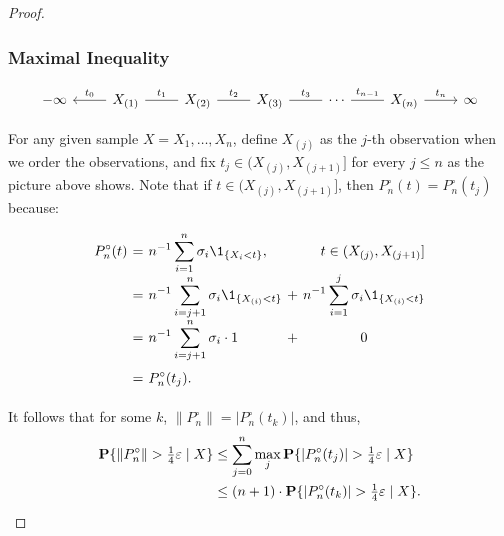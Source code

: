 \begin{proof}
  \vspace*{1em}

  \subsubsection*{Maximal Inequality}

  \[\begin{tikzcd}
    {-\infty} & {X_{(1)}} & {X_{(2)}} & {X_{(3)}} & \cdots & {X_{(n)}} & \infty
    \arrow["{t_1}", no head, from=1-2, to=1-3]%
    \arrow["{t_2}", no head, from=1-3, to=1-4]%
    \arrow["{t_3}", no head, from=1-4, to=1-5]%
    \arrow["{t_{n-1}}", no head, from=1-5, to=1-6]%
    \arrow["{t_0}"', from=1-2, to=1-1]%
    \arrow["{t_n}", from=1-6, to=1-7]%
  \end{tikzcd}\]

  For any given sample $X = X_1, \ldots, X_n$, define $X_{(j)}$ as the $j$-th observation when we order the observations, and fix $t_j \in (X_{(j)}, X_{(j+1)}]$ for every $j\leq n$ as the picture above shows. Note that if $t \in (X_{(j)}, X_{(j+1)}]$, then $P_n^\circ (t) = P_n^\circ (t_j)$ because:  %

  \[ \everymath{\displaystyle}\arraycolsep=1.8pt\def\arraystretch{1.8}
  \begin{array}{rclcl}
    P_n^\circ (t) & = & n^{-1}\sum_{i = 1}^n \sigma_i\1_{\{ X_i < t\}}, & & \hfill t \in (X_{(j)}, X_{(j+1)}] \\ %
    & = & n^{-1}\sum_{i = j+1}^{n} \sigma_i\1_{\{ X_{(i)} < t\}} & + & n^{-1} \sum_{i = 1}^{j} \sigma_i \1_{\{ X_{(i)} < t\}}\\
    & = & n^{-1}\sum_{i = j+1}^{n} \sigma_i \cdot 1 & + &  \hfill0\hfill\\
    & = & P_n^\circ (t_j).
  \end{array}
  \]

  It follows that for some $k$, $\|P_n^\circ\| = |P_n^\circ (t_k)|$, and thus,
   \begin{equation} \label{gc:3}
    \everymath{\displaystyle}\arraycolsep=1.4pt\def\arraystretch{1.5}
    \begin{array}{rcl}
      \P\{ \|P_n^\circ\| > \tfrac{1}{4} \varepsilon \;|\; X \} & \leq & \sum_{j = 0}^n \max_j \P\{ |P_n^\circ(t_j)| > \tfrac{1}{4} \varepsilon \;|\; X \}\\
      & \leq & (n+1) \cdot \P\{ |P_n^\circ(t_k)| > \tfrac{1}{4} \varepsilon \;|\; X \} .
    \end{array} 
  \end{equation}
  \vspace*{1em}


\end{proof}
